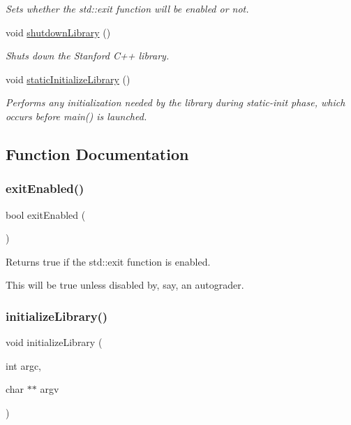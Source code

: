 \begin{DoxyCompactItemize}
$$\begin{DoxyCompactList}\small\item\em Sets whether the std\+::exit function will be enabled or not. \end{DoxyCompactList}\item 
void \mbox{\hyperlink{namespacestanfordcpplib_a2937cb1c4385064875d0cb29fcdfeae6}{shutdown\+Library}} ()
\begin{DoxyCompactList}\small\item\em Shuts down the Stanford C++ library. \end{DoxyCompactList}\item 
void \mbox{\hyperlink{namespacestanfordcpplib_ad5dc96d7e324f70b6bd681ad41abcaa7}{static\+Initialize\+Library}} ()
\begin{DoxyCompactList}\small\item\em Performs any initialization needed by the library during static-\/init phase, which occurs before main() is launched. \end{DoxyCompactList}\end{DoxyCompactItemize}


\subsection{Function Documentation}
\mbox{\label{namespacestanfordcpplib_a5bb1fbda6b82680cc8f04064e55a85c6}} 
\subsubsection{\texorpdfstring{exit\+Enabled()}{exitEnabled()}}
{\footnotesize\ttfamily bool exit\+Enabled (\begin{DoxyParamCaption}{ }\end{DoxyParamCaption})}



Returns true if the std\+::exit function is enabled. 

This will be true unless disabled by, say, an autograder. \mbox{\label{namespacestanfordcpplib_ab36f2e19ed11765f2b025cc8e4636010}} 
\subsubsection{\texorpdfstring{initialize\+Library()}{initializeLibrary()}}
{\footnotesize\ttfamily void initialize\+Library (\begin{DoxyParamCaption}\item[{int}]{argc,  }\item[{char $\ast$$\ast$}]{argv }\end{DoxyParamCaption})}



